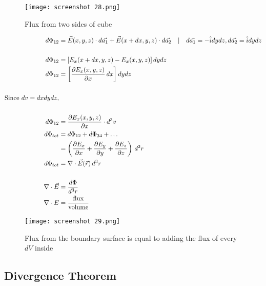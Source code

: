 \documentclass[svgnames]{article}   	%
\begin{document}

\begin{figure}[htb!]
  \centering
    \texttt{[image: screenshot 28.png]}
    \caption{Flux from two sides of cube}
\end{figure}
\vspace{5px}


\begin{align*}
  d\Phi_{12} &= \vec{E}(x,y,z) \cdot d\vec{a_1} + \vec{E}(x+dx, y,z) \cdot
  d\vec{a_2} \hspace{10px} | \hspace{10px} 
   d\vec{a_1} = -\hat{i}dydz, d\vec{a_2} = \hat{i}dydz\\ \\
  d\Phi_{12} &=[ E_x (x + dx, y,z) -  E_x(x,y,z) ] \, dydz\\
  d\Phi_{12} &= \left[\frac{\partial E_x(x,y,z)}{\partial x} \, dx\right]
  dydz\\ \\
\text{Since } dv = dxdydz, \\ \\
  d\Phi_{12} &= \frac{\partial E_x(x,y,z)}{\partial x}  \cdot d^3v\\
  d\Phi_{tot} &= d\Phi_{12} + d\Phi_{34} + \dots\\
              &= \left( \frac{\partial E_x}{\partial x}  + \frac{\partial E_y}{\partial y}
  + \frac{\partial E_z}{\partial z} \right) \, d^3 r \\
  d\Phi_{tot} &= \nabla \cdot \vec{E}(\vec{r}) \, d^3 r\\\\
  \nabla \cdot \vec{E} &= \frac{d \Phi}{d^3 r} \\
  \nabla \cdot E &= \frac{\text{flux}}{\text{volume}}
\end{align*} 
\vspace{5px}


\begin{figure}[htb!]
  \centering
    \texttt{[image: screenshot 29.png]}
    \caption{Flux from the boundary surface is equal to adding the flux of
    every $dV$ inside}
\end{figure}




\subsection{Divergence Theorem}
\end{document}
